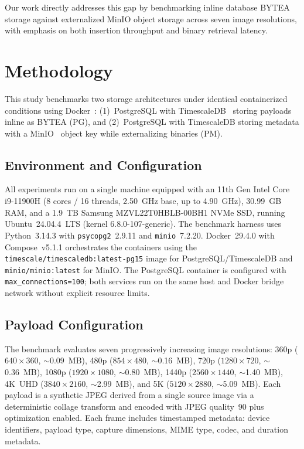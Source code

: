 \documentclass[conference, a4paper]{IEEEtran}
\begin{document}
Our work directly addresses this gap by benchmarking inline database BYTEA storage against externalized MinIO object storage across seven image resolutions, with emphasis on both insertion throughput and binary retrieval latency.


\section{Methodology}
\label{sec:methodology}

This study benchmarks two storage architectures under identical containerized conditions using Docker~\cite{docker_official}: (1)~PostgreSQL with TimescaleDB~\cite{timescaledb_official} storing payloads inline as BYTEA (PG), and (2)~PostgreSQL with TimescaleDB storing metadata with a MinIO~\cite{minio_official} object key while externalizing binaries (PM).

\subsection{Environment and Configuration}
All experiments run on a single machine equipped with an 11th Gen Intel Core i9-11900H (8 cores / 16 threads, 2.50~GHz base, up to 4.90~GHz), 30.99~GB RAM, and a 1.9~TB Samsung MZVL22T0HBLB-00BH1 NVMe SSD, running Ubuntu~24.04.4~LTS (kernel 6.8.0-107-generic). The benchmark harness uses Python~3.14.3 with \texttt{psycopg2}~2.9.11 and \texttt{minio}~7.2.20. Docker~29.4.0 with Compose~v5.1.1 orchestrates the containers using the \texttt{timescale/timescaledb:latest-pg15} image for PostgreSQL/TimescaleDB and \texttt{minio/minio:latest} for MinIO. The PostgreSQL container is configured with \texttt{max\_connections=100}; both services run on the same host and Docker bridge network without explicit resource limits.

\subsection{Payload Configuration}
The benchmark evaluates seven progressively increasing image resolutions: 360p ($640{\times}360$, $\sim$0.09~MB), 480p ($854{\times}480$, $\sim$0.16~MB), 720p ($1280{\times}720$, $\sim$0.36~MB), 1080p ($1920{\times}1080$, $\sim$0.80~MB), 1440p ($2560{\times}1440$, $\sim$1.40~MB), 4K~UHD ($3840{\times}2160$, $\sim$2.99~MB), and 5K ($5120{\times}2880$, $\sim$5.09~MB). Each payload is a synthetic JPEG derived from a single source image via a deterministic collage transform and encoded with JPEG quality~90 plus optimization enabled. Each frame includes timestamped metadata: device identifiers, payload type, capture dimensions, MIME type, codec, and duration metadata.
\end{document}
